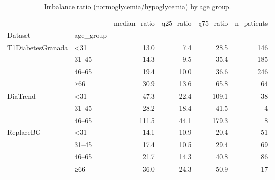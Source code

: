 \begin{table}
\caption{Imbalance ratio (normoglycemia/hypoglycemia) by age group.}
\label{tab:imbalance_ratio_age}
\begin{tabular}{llrrrr}
\toprule
 &  & median\_ratio & q25\_ratio & q75\_ratio & n\_patients \\
Dataset & age_group &  &  &  &  \\
\midrule
\multirow[t]{4}{*}{T1DiabetesGranada} & <31 & 13.0 & 7.4 & 28.5 & 146 \\
 & 31–45 & 14.3 & 9.5 & 35.4 & 185 \\
 & 46–65 & 19.4 & 10.0 & 36.6 & 246 \\
 & ≥66 & 30.9 & 13.6 & 65.8 & 64 \\
\cline{1-6}
\multirow[t]{3}{*}{DiaTrend} & <31 & 47.3 & 22.4 & 109.1 & 38 \\
 & 31–45 & 28.2 & 18.4 & 41.5 & 4 \\
 & 46–65 & 111.5 & 44.1 & 179.3 & 8 \\
\cline{1-6}
\multirow[t]{4}{*}{ReplaceBG} & <31 & 14.1 & 10.9 & 20.4 & 51 \\
 & 31–45 & 17.4 & 10.5 & 29.4 & 69 \\
 & 46–65 & 21.7 & 14.3 & 40.8 & 86 \\
 & ≥66 & 36.0 & 24.3 & 50.9 & 17 \\
\cline{1-6}
\bottomrule
\end{tabular}
\end{table}

